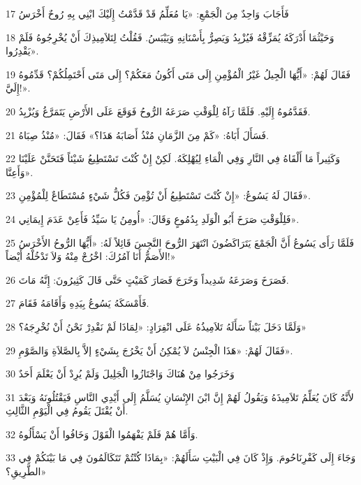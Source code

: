 \par 17 فَأَجَابَ وَاحِدٌ مِنَ الْجَمْعِ: «يَا مُعَلِّمُ قَدْ قَدَّمْتُ إِلَيْكَ ابْنِي بِهِ رُوحٌ أَخْرَسُ
\par 18 وَحَيْثُمَا أَدْرَكَهُ يُمَزِّقْهُ فَيُزْبِدُ وَيَصِرُّ بِأَسْنَانِهِ وَيَيْبَسُ. فَقُلْتُ لِتَلاَمِيذِكَ أَنْ يُخْرِجُوهُ فَلَمْ يَقْدِرُوا».
\par 19 فَقَالَ لَهُمْ: «أَيُّهَا الْجِيلُ غَيْرُ الْمُؤْمِنِ إِلَى مَتَى أَكُونُ مَعَكُمْ؟ إِلَى مَتَى أَحْتَمِلُكُمْ؟ قَدِّمُوهُ إِلَيَّ!».
\par 20 فَقَدَّمُوهُ إِلَيْهِ. فَلَمَّا رَآهُ لِلْوَقْتِ صَرَعَهُ الرُّوحُ فَوَقَعَ عَلَى الأَرْضِ يَتَمَرَّغُ وَيُزْبِدُ.
\par 21 فَسَأَلَ أَبَاهُ: «كَمْ مِنَ الزَّمَانِ مُنْذُ أَصَابَهُ هَذَا؟» فَقَالَ: «مُنْذُ صِبَاهُ.
\par 22 وَكَثِيراً مَا أَلْقَاهُ فِي النَّارِ وَفِي الْمَاءِ لِيُهْلِكَهُ. لَكِنْ إِنْ كُنْتَ تَسْتَطِيعُ شَيْئاً فَتَحَنَّنْ عَلَيْنَا وَأَعِنَّا».
\par 23 فَقَالَ لَهُ يَسُوعُ: «إِنْ كُنْتَ تَسْتَطِيعُ أَنْ تُؤْمِنَ فَكُلُّ شَيْءٍ مُسْتَطَاعٌ لِلْمُؤْمِنِ».
\par 24 فَلِلْوَقْتِ صَرَخَ أَبُو الْوَلَدِ بِدُمُوعٍ وَقَالَ: «أُومِنُ يَا سَيِّدُ فَأَعِنْ عَدَمَ إِيمَانِي».
\par 25 فَلَمَّا رَأَى يَسُوعُ أَنَّ الْجَمْعَ يَتَرَاكَضُونَ انْتَهَرَ الرُّوحَ النَّجِسَ قَائِلاً لَهُ: «أَيُّهَا الرُّوحُ الأَخْرَسُ الأَصَمُّ أَنَا آمُرُكَ: اخْرُجْ مِنْهُ وَلاَ تَدْخُلْهُ أَيْضاً!»
\par 26 فَصَرَخَ وَصَرَعَهُ شَدِيداً وَخَرَجَ فَصَارَ كَمَيْتٍ حَتَّى قَالَ كَثِيرُونَ: إِنَّهُ مَاتَ.
\par 27 فَأَمْسَكَهُ يَسُوعُ بِيَدِهِ وَأَقَامَهُ فَقَامَ.
\par 28 وَلَمَّا دَخَلَ بَيْتاً سَأَلَهُ تَلاَمِيذُهُ عَلَى انْفِرَادٍ: «لِمَاذَا لَمْ نَقْدِرْ نَحْنُ أَنْ نُخْرِجَهُ؟»
\par 29 فَقَالَ لَهُمْ: «هَذَا الْجِنْسُ لاَ يُمْكِنُ أَنْ يَخْرُجَ بِشَيْءٍ إلاَّ بِالصَّلاَةِ وَالصَّوْمِ».
\par 30 وَخَرَجُوا مِنْ هُنَاكَ وَاجْتَازُوا الْجَلِيلَ وَلَمْ يُرِدْ أَنْ يَعْلَمَ أَحَدٌ
\par 31 لأَنَّهُ كَانَ يُعَلِّمُ تَلاَمِيذَهُ وَيَقُولُ لَهُمْ إِنَّ ابْنَ الإِنْسَانِ يُسَلَّمُ إِلَى أَيْدِي النَّاسِ فَيَقْتُلُونَهُ وَبَعْدَ أَنْ يُقْتَلَ يَقُومُ فِي الْيَوْمِ الثَّالِثِ.
\par 32 وَأَمَّا هُمْ فَلَمْ يَفْهَمُوا الْقَوْلَ وَخَافُوا أَنْ يَسْأَلُوهُ.
\par 33 وَجَاءَ إِلَى كَفْرِنَاحُومَ. وَإِذْ كَانَ فِي الْبَيْتِ سَأَلَهُمْ: «بِمَاذَا كُنْتُمْ تَتَكَالَمُونَ فِي مَا بَيْنَكُمْ فِي الطَّرِيقِ؟»
